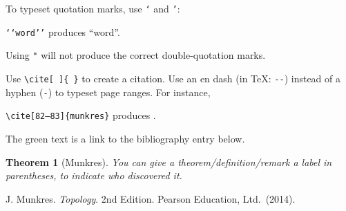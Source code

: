 \documentclass[a4paper,10pt,leqno]{article}
\numberwithin{equation}{section}
\theoremstyle{plain}
\newtheorem{thm}{Theorem}[section]
\theoremstyle{definition}
\theoremstyle{remark}
\begin{document}
To typeset quotation marks, use \texttt{`} and \texttt{'}:
\begin{center}
\texttt{`{}`word'{}'}
produces 
``word''.
\end{center}
Using \texttt{"} will not produce the correct double-quotation marks.

Use \texttt{\textbackslash{}cite[ ]\{ \}} to create a citation.
Use an en dash (in \TeX: \texttt{-{}-}) instead of a hyphen (\texttt{-}) to typeset page ranges.
For instance,
\begin{center}
\texttt{\textbackslash{}cite[82--83]\{munkres\}}
produces
\cite[82--83]{munkres}.
\end{center}
The green text is a link to the bibliography entry below.

\begin{thm}[Munkres]
You can give a theorem/definition/remark a label in parentheses, to indicate who discovered it.
\end{thm}


\frenchspacing
\begin{thebibliography}{11}
	J. Munkres.
	\textsl{Topology}.
	2nd Edition.
	Pearson Education, Ltd.\ (2014).
	
	
\end{thebibliography}
\end{document}
